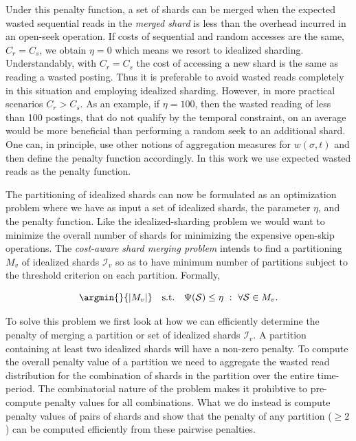 Under this penalty function, a set of shards can be merged when the expected wasted sequential reads in the \emph{merged shard} is less than the
overhead incurred in an open-seek operation. If costs of sequential and random accesses are the same, $C_r = C_s$, we obtain $\eta = 0$ which means we resort to idealized sharding. Understandably, with $C_r = C_s$  the cost of accessing a new shard is the same as reading a wasted posting. Thus it is preferable to avoid wasted reads completely in this situation and employing idealized sharding. However, in more practical scenarios $C_r > C_s$.  As an example, if $\eta
= 100$, then the wasted reading of less than 100 postings, that do not
qualify by the temporal constraint, on an average would be more
beneficial than performing a random seek to an additional shard. One can, in principle, use other notions of aggregation measures for $w(\sigma, t)$ and then define the penalty function accordingly. In this work we use expected wasted reads as the penalty function. 


The partitioning of idealized shards can now be formulated as an optimization problem where we have as input a set of idealized shards, the parameter $\eta$, and the penalty function. Like the idealized-sharding problem we would want to minimize the overall number of shards for minimizing the expensive open-skip operations. The \emph{cost-aware shard merging problem} intends to find a partitioning $M_v$ of idealized shards $\mathcal{I}_v$ so as to have minimum number of partitions subject to the threshold criterion on each partition. Formally, 

\begin{definition}

$$
\argmin{}{\left|M_v\right|} \quad \mbox{s.t.} \quad \Psi(\mathcal{S})  \leq \eta \,\,: \,\, \forall \mathcal{S} \in M_v.
$$

\label{def:mwr}
\end{definition}


To solve this problem we first look at how we can efficiently determine the penalty of merging a partition or set of idealized shards $\mathcal{I}_v$. 
A partition containing at least two idealized shards will have a non-zero penalty. To compute the overall penalty value of a partition we need to aggregate the wasted read distribution for the combination of shards in the partition over the entire time-period. The combinatorial nature of the problem makes it prohibtive to pre-compute penalty values for all combinations. What we do instead is compute penalty values of pairs of shards and show that the penalty of any partition ($\ge 2$) can be computed efficiently from these pairwise penalties.

